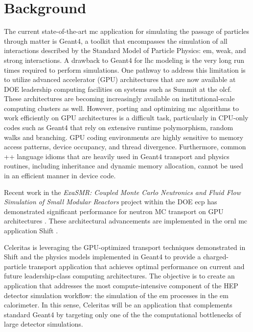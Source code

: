 \documentclass[10pt]{article}
\begin{document}
\section*{Background}

The current state-of-the-art \ac{mc} application for simulating the passage of
particles through matter is Geant4, a toolkit that encompasses the simulation of
all interactions described by the Standard Model of Particle Physics:
\ac{em}, weak, and strong interactions. A drawback to Geant4 for
\ac{lhc} modeling is the very long run times required to perform simulations.
One pathway to address this limitation is to utilize advanced accelerator (GPU)
architectures that are now available at DOE leadership computing facilities on
systems such as Summit at the \ac{olcf}. These architectures are becoming
increasingly available on institutional-scale computing clusters as well.
However, porting and optimizing \ac{mc} algorithms to work efficiently on GPU
architectures is a difficult task, particularly in CPU-only codes such as Geant4
that rely on extensive runtime polymorphism, random walks and branching. GPU
coding environments are highly sensitive to memory access patterns, device
occupancy, and thread divergence. Furthermore, common \C++ language idioms that
are heavily used in Geant4 transport and physics routines, including inheritance
and dynamic memory allocation, cannot be used in an efficient manner in device
code.

Recent work in the \emph{ExaSMR: Coupled Monte Carlo Neutronics and Fluid Flow
Simulation of Small Modular Reactors} project within the DOE \ac{ecp}
\cite{ecp2019} has demonstrated significant performance for neutron MC transport
on GPU architectures \cite{hamilton_continuous-energy_2019}. These architectural
advancements are implemented in the \ac{ornl} \ac{mc} application Shift
\cite{pandya_implementation_2016}.

Celeritas is leveraging the GPU-optimized transport techniques demonstrated in
Shift and the physics models implemented in Geant4 to provide a charged-particle
transport application that achieves optimal performance on current and future
leadership-class computing architectures. The objective is to create an
application that addresses the most compute-intensive component of the HEP
detector simulation workflow: the simulation of the \ac{em} processes in the
\ac{em} calorimeter. In this sense, Celeritas will be an application that
complements standard Geant4 by targeting only one of the the computational
bottlenecks of large detector simulations.
\end{document}
